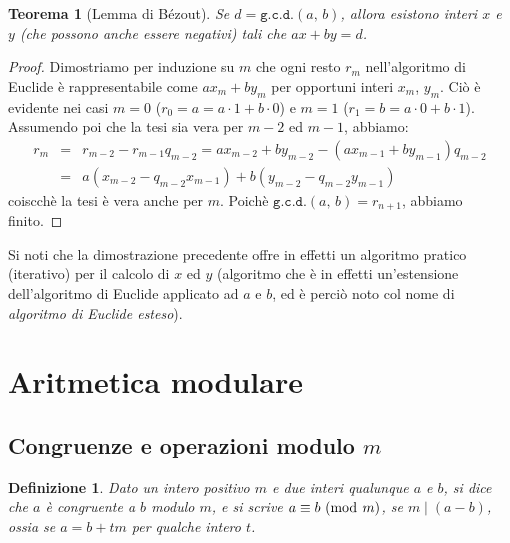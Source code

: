 \documentclass[pdflatex,11pt,a4paper,oneside]{article}
\let\OldEmph\emph
\renewcommand{\emph}[1]{\OldEmph{#1\/}}
\newcommand{\p}[1]{\left({#1}\right)}
\newcommand{\divides}[0]{\mid}
\newcommand{\congruent}[0]{\equiv}
\newcommand{\mmodop}[0]{\ensuremath{\operatorname{mod}}}
\newcommand{\mmod}[1]{\ensuremath{\allowbreak\ (\mmodop\:{#1})}}
\newcommand{\gcdop}[0]{\ensuremath{\mathtt{g.c.d.}}}
\newcommand{\xgcd}[1]{\ensuremath{\gcdop\left({#1}\right)}}
\renewcommand{\gcd}[2]{\xgcd{{#1},\,{#2}}}
\newtheorem{theorem}[TheoremLike]{Teorema}
\newtheorem{definition}[TheoremLike]{Definizione}
\begin{document}
\begin{theorem}[Lemma di B\'ezout]\label{thm:lemma-bezout}
Se $d = \gcd{a}{b}$, allora esistono interi $x$ e $y$ (che possono
anche essere negativi) tali che $ax + by = d$.
\end{theorem}
%
\begin{proof}
Dimostriamo per induzione su $m$ che ogni resto $r_m$ nell'algoritmo
di Euclide \`e rappresentabile come $ax_m + by_m$ per opportuni interi
$x_m$, $y_m$. Ci\`o \`e evidente nei casi $m = 0$ ($r_0 = a = a \cdot 1 +
b \cdot 0$) e $m = 1$ ($r_1 = b = a \cdot 0 + b \cdot 1$). Assumendo poi
che la tesi sia vera per $m - 2$ ed $m - 1$, abbiamo:
\begin{eqnarray*}
r_m & = & r_{m-2} - r_{m-1} q_{m-2} = ax_{m-2} + by_{m-2} -
                                      \p{ax_{m-1} + by_{m-1}} q_{m-2} \\
& = &
a\p{x_{m-2} - q_{m-2}x_{m-1}} + b\p{y_{m-2} - q_{m-2}y_{m-1}}
\end{eqnarray*}
coiscch\`e la tesi \`e vera anche per $m$.  Poich\`e $\gcd{a}{b} =
r_{n+1}$, abbiamo finito.
\end{proof}

Si noti che la dimostrazione precedente offre in effetti un algoritmo
pratico (iterativo) per il calcolo di  $x$ ed $y$ (algoritmo che \`e in
effetti un'estensione dell'algoritmo di Euclide applicato ad $a$ e $b$,
ed \`e perci\`o noto col nome di \emph{algoritmo di Euclide esteso}).


\section{Aritmetica modulare}


\subsection{Congruenze e operazioni modulo $m$}

\begin{definition}
Dato un intero positivo $m$ e due interi qualunque $a$ e $b$, si dice che
\emph{$a$ \`e congruente a $b$ modulo $m$}, e si scrive $a \congruent b
\mmod m$, se $m \divides \p{a - b}$, ossia se $a = b + tm$ per qualche
intero $t$.
\end{definition}
\end{document}

